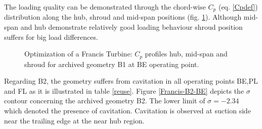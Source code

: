 The loading quality can be demonstrated through the chord-wise $C_p$ (eq. \ref{Cpdef}) distribution along the hub, shroud and mid-span positions (fig. \ref{Francis-B1-LOAD}). Although mid-span and hub demonstrate relatively good loading behaviour shroud position suffers for big load differences.      

\begin{figure}[h!]
\begin{minipage}[b]{1\linewidth}
 \centering
\end{minipage}
\caption{Optimization of a Francis Turbine: $C_p$ profiles hub, mid-span and shroud for archived geometry B1 at BE operating point.}
\label{Francis-B1-LOAD}
\end{figure}

Regarding B2, the geometry suffers from cavitation in all operating points BE,PL and FL as it is illustrated in table \ref{reuse}. Figure \ref{Francis-B2-BE} depicts the $\sigma$ contour concerning the archived geometry B2. The lower limit of $\sigma = -2.34$ which denoted the presence of cavitation. Cavitation is observed at suction side near the trailing edge at the near hub region.     


